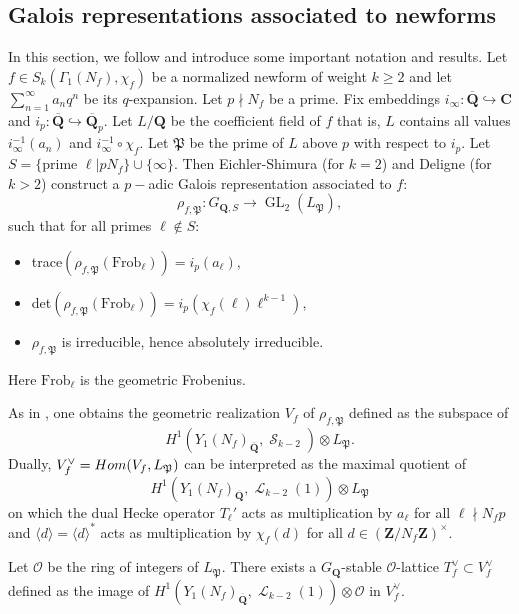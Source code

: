 \documentclass[10pt,letterpaper]{amsart}
\theoremstyle{plain}
\theoremstyle{definition}
\theoremstyle{definition}
\theoremstyle{plain}
\theoremstyle{plain}
\theoremstyle{plain}
\theoremstyle{remark}
\numberwithin{equation}{section}
\DeclareMathOperator{\GL}{GL}
\DeclareMathOperator{\et}{\acute{e}t}
\DeclareMathOperator{\Ll}{\mathscr{L}}
\DeclareMathOperator{\Ss}{\mathscr{S}}
\newcommand{\bC}{\mathbf{C}}
\def\cO{\mathcal O}
\newcommand{\Q}{\mathbf{Q}}
\newcommand{\Z}{\mathbf{Z}}
\begin{document}
\subsection{Galois representations associated to newforms} In this section, we follow \cite[Sec.\,1.1]{CD} and introduce some important notation and results. Let $f\in S_k(\Gamma_1(N_f),\chi_f)$ be a normalized newform of weight $k\ge 2$ and let $\sum_{n=1}^\infty a_n q^n$ be its $q$-expansion. Let $p\nmid N_f$ be a prime. Fix embeddings $i_\infty: \overline{\Q}\hookrightarrow \bC$ and $i_p: \overline{\Q}\hookrightarrow \overline{\Q}_p$. Let $L/\Q$ be the coefficient field of $f$ that is, $L$ contains all values $i_\infty^{-1}(a_n)$ and $i_\infty^{-1}\circ \chi_f$. Let $\mathfrak{P}$ be the prime of $L$ above $p$ with respect to $i_p$. Let $S=\{\text{prime }\ell| pN_f\}\cup \{\infty\}$. Then Eichler-Shimura (for $k=2$) and Deligne (for $k>2$) construct a $p-$adic Galois representation associated to $f$:
\begin{equation*}
    \rho_{f,\mathfrak{P}}:G_{\Q,S}\rightarrow \GL_2(L_{\mathfrak{P}}),
\end{equation*}
such that for all primes $\ell\notin S$:
\begin{itemize}
    \item trace$(\rho_{f,\mathfrak{P}}(\mathrm{Frob}_\ell))=i_p(a_\ell)$,
    \item det$(\rho_{f,\mathfrak{P}}(\mathrm{Frob}_\ell))=i_p(\chi_f(\ell)\ell^{k-1})$,
    \item $\rho_{f,\mathfrak{P}}$ is irreducible, hence absolutely irreducible.
\end{itemize}
 Here $\mathrm{Frob}_\ell$ is the geometric Frobenius.

 As in \cite[Sec.\,1.1]{CD}, one obtains the geometric realization $V_f$ of $\rho_{f,\mathfrak{P}}$ defined as the subspace of
\[
H^1_{\et}(Y_1(N_f)_{\overline{\Q}},\Ss_{k-2})\otimes L_{\mathfrak{P}}.
\]
Dually, $V_f^{\vee}={\rm Hom}(V_f,L_{\mathfrak{P}})$ 
 can be interpreted as the maximal quotient of 
\[
H^1_{\et}(Y_1(N_f)_{\overline{\Q}},\Ll_{k-2}(1))\otimes L_{\mathfrak{P}}
\]
on which the dual Hecke operator $T_\ell'$ acts as multiplication by $a_\ell$ for all $\ell\nmid N_fp$ and $\langle d\rangle = \langle d\rangle^{*}$ acts as multiplication by $\chi_f(d)$ for all $d\in (\Z/N_f\Z)^\times$. 

Let $\cO$ be the ring of integers of $L_\mathfrak{P}$. There exists a $G_{\Q}$-stable $\cO$-lattice $T_f^\vee\subset V_f^\vee$ defined as the image of 
$H^1_{\et}(Y_1(N_f)_{\overline{\Q}},\Ll_{k-2}(1))\otimes\cO$ in $V_f^\vee$.
\end{document}
